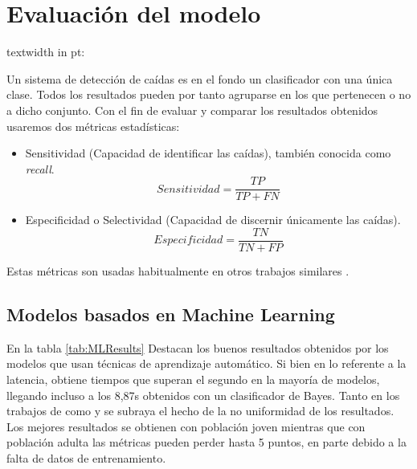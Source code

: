 \documentclass[../tfm.tex]{subfiles}
\begin{document}

\section{Evaluación del modelo}\label{eval_modelo}
textwidth in pt: \the\textwidth


Un sistema de detección de caídas es en el fondo un clasificador con una única clase. Todos los resultados pueden por tanto agruparse en los que pertenecen o no a dicho conjunto. Con el fin de evaluar y comparar los resultados obtenidos usaremos dos métricas estadísticas:
\begin{itemize}
  \item Sensitividad (Capacidad de identificar las caídas), también conocida como \textit{recall}.
  \[
    Sensitividad = \frac{TP}{TP+FN}
  \]
  \item Especificidad o Selectividad (Capacidad de discernir únicamente las caídas).
  \[
    Especificidad = \frac{TN}{TN+FP}
  \]
\end{itemize}

Estas métricas son usadas habitualmente en otros trabajos similares\cite{Noury2007,Chen2005, Bourke2006}
.



\subsection{Modelos basados en Machine Learning}

En la tabla \ref{tab:MLResults} Destacan los buenos resultados obtenidos por los modelos que usan técnicas de aprendizaje automático. Si bien en lo referente a la latencia, \cite{Liu2020} obtiene tiempos que superan el segundo en la mayoría de modelos, llegando incluso a los 8,87s obtenidos con un clasificador de Bayes. Tanto en los trabajos de \cite{Liu2020} como \cite{Musci2020} y \cite{Torti2018} se subraya el hecho de la no uniformidad de los resultados. Los mejores resultados se obtienen con población joven mientras que con población adulta las métricas pueden perder hasta 5 puntos, en parte debido a la falta de datos de entrenamiento.
\end{document}

